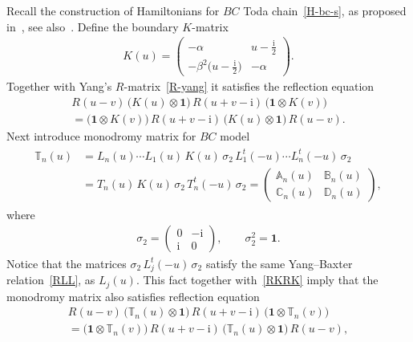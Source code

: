 \documentclass[11pt]{article}
\numberwithin{equation}{section}
\theoremstyle{plain}
\theoremstyle{definition}
\newcommand{\T}{\mathbb{T}}
\newcommand{\A}{\mathbb{A}}
\newcommand{\B}{\mathbb{B}}
\newcommand{\C}{\mathbb{C}}
\newcommand{\D}{\mathbb{D}}
\renewcommand{\imath}{\mathrm{i}}
\begin{document}
Recall the construction of Hamiltonians for $BC$ Toda chain~\eqref{H-bc-s}, as proposed in~\cite{Skl}, see also~\cite[Section 4]{IS}. Define the boundary $K$-matrix
\begin{align}\label{KToda}
	K(u) =  
	\begin{pmatrix}
		-\alpha & u - \frac{\imath}{2} \\[6pt]
		- \beta^2 \bigl(u - \frac{\imath}{2} \bigr) & -\alpha
	\end{pmatrix}.
\end{align}
Together with Yang's $R$-matrix~\eqref{R-yang} it satisfies the reflection equation
\begin{multline}\label{RKRK}
	R(u - v) \, \bigl( K(u) \otimes \bm{1} \bigr) \, R(u + v - \imath) \, \bigl( \bm{1} \otimes K(v) \bigr) \\[6pt]
	= \bigl( \bm{1} \otimes K(v) \bigr) \, R(u + v - \imath) \, \bigl( K(u) \otimes \bm{1} \bigr) \, R(u - v).
\end{multline}
Next introduce monodromy matrix for $BC$ model
\begin{align} \label{Tn-bc}
	\begin{aligned}
		\T_n(u) &= L_n(u) \cdots L_1(u) \, K(u) \, \sigma_2 \, L^t_1(-u) \cdots L^t_n(-u) \, \sigma_2 \\[6pt]
		& = T_n(u) \, K(u) \, \sigma_2 \, T_n^t(-u) \, \sigma_2 =
		\begin{pmatrix}
			\A_n(u) & \B_n(u) \\[4pt]
			\C_n(u) & \D_n(u)
		\end{pmatrix},
	\end{aligned}
\end{align}
where 
\begin{align}
	\sigma_2 = \begin{pmatrix}
		0 & -\imath \\
		\imath & 0
	\end{pmatrix}, \qquad \sigma_2^2 = \bm{1}.
\end{align}
Notice that the matrices $\sigma_2 \, L_j^t(-u) \, \sigma_2$ satisfy the same Yang--Baxter relation~\eqref{RLL}, as $L_j(u)$. This fact together with~\eqref{RKRK} imply that the monodromy matrix also satisfies reflection equation
\begin{multline}\label{RTRT}
	R(u - v) \, \bigl( \T_n(u) \otimes \bm{1} \bigr) \, R(u + v - \imath) \, \bigl( \bm{1} \otimes \T_n(v) \bigr) \\[6pt]
	= \bigl( \bm{1} \otimes \T_n(v) \bigr) \, R(u + v - \imath) \, \bigl( \T_n(u) \otimes \bm{1} \bigr) \, R(u - v),
\end{multline}
\end{document}
